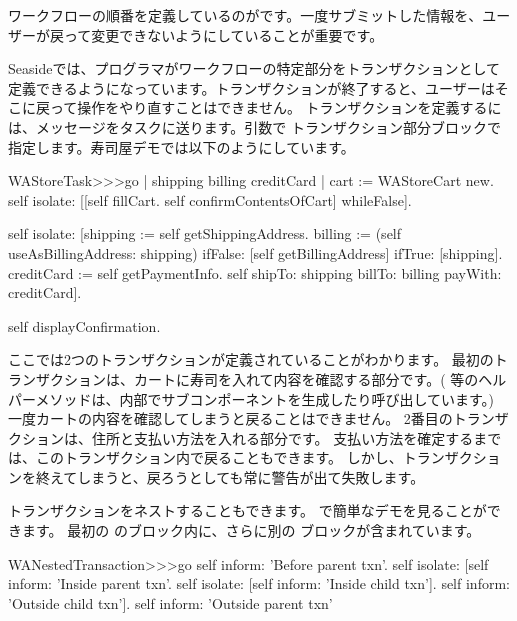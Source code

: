 \documentclass[a4paper,10pt,twoside]{book}
\begin{document}
ワークフローの順番を定義しているのがです。一度サブミットした情報を、ユーザーが戻って変更できないようにしていることが重要です。


Seasideでは、プログラマがワークフローの特定部分をトランザクションとして定義できるようになっています。トランザクションが終了すると、ユーザーはそこに戻って操作をやり直すことはできません。
トランザクションを定義するには、メッセージをタスクに送ります。引数で
トランザクション部分ブロックで指定します。寿司屋デモでは以下のようにしています。

\begin{code}{}
WAStoreTask>>>go
	| shipping billing creditCard |
	cart := WAStoreCart new.
	self isolate:
		[[self fillCart.
		self confirmContentsOfCart]
			whileFalse].

	self isolate:
		[shipping := self getShippingAddress.
		billing := (self useAsBillingAddress: shipping)
					ifFalse: [self getBillingAddress]
					ifTrue: [shipping].
		creditCard := self getPaymentInfo.
		self shipTo: shipping billTo: billing payWith: creditCard].

	self displayConfirmation.
\end{code}

ここでは2つのトランザクションが定義されていることがわかります。
最初のトランザクションは、カートに寿司を入れて内容を確認する部分です。(  等のヘルパーメソッドは、内部でサブコンポーネントを生成したり呼び出しています。)
一度カートの内容を確認してしまうと戻ることはできません。
2番目のトランザクションは、住所と支払い方法を入れる部分です。
支払い方法を確定するまでは、このトランザクション内で戻ることもできます。
しかし、トランザクションを終えてしまうと、戻ろうとしても常に警告が出て失敗します。

トランザクションをネストすることもできます。
で簡単なデモを見ることができます。
最初の のブロック内に、さらに別の ブロックが含まれています。

\begin{code}{}
WANestedTransaction>>>go
	self inform: 'Before parent txn'.
	self isolate:
			[self inform: 'Inside parent txn'.
			self isolate: [self inform: 'Inside child txn'].
			self inform: 'Outside child txn'].
	self inform: 'Outside parent txn'
\end{code}
\end{document}
